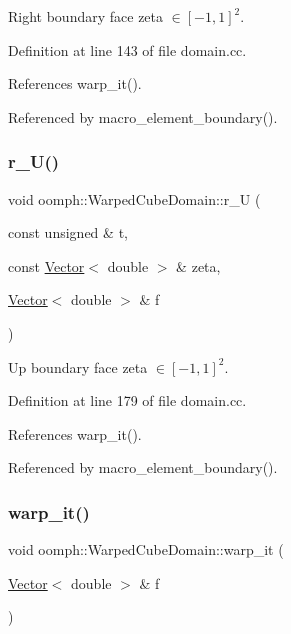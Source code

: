 Right boundary face zeta $ \in [-1,1]^2 $. 



Definition at line 143 of file domain.\+cc.



References warp\+\_\+it().



Referenced by macro\+\_\+element\+\_\+boundary().

\mbox{\label{classoomph_1_1WarpedCubeDomain_a1f9227fe44a88e0bd4b2106b8a40643b}} 
\subsubsection{\texorpdfstring{r\+\_\+\+U()}{r\_U()}}
{\footnotesize\ttfamily void oomph\+::\+Warped\+Cube\+Domain\+::r\+\_\+U (\begin{DoxyParamCaption}\item[{const unsigned \&}]{t,  }\item[{const \hyperlink{classoomph_1_1Vector}{Vector}$<$ double $>$ \&}]{zeta,  }\item[{\hyperlink{classoomph_1_1Vector}{Vector}$<$ double $>$ \&}]{f }\end{DoxyParamCaption})\hspace{0.3cm}{\ttfamily [private]}}



Up boundary face zeta $ \in [-1,1]^2 $. 



Definition at line 179 of file domain.\+cc.



References warp\+\_\+it().



Referenced by macro\+\_\+element\+\_\+boundary().

\mbox{\label{classoomph_1_1WarpedCubeDomain_ac84408d0e83979c1516e1f597e8e71e0}} 
\subsubsection{\texorpdfstring{warp\+\_\+it()}{warp\_it()}}
{\footnotesize\ttfamily void oomph\+::\+Warped\+Cube\+Domain\+::warp\+\_\+it (\begin{DoxyParamCaption}\item[{\hyperlink{classoomph_1_1Vector}{Vector}$<$ double $>$ \&}]{f }\end{DoxyParamCaption})}



